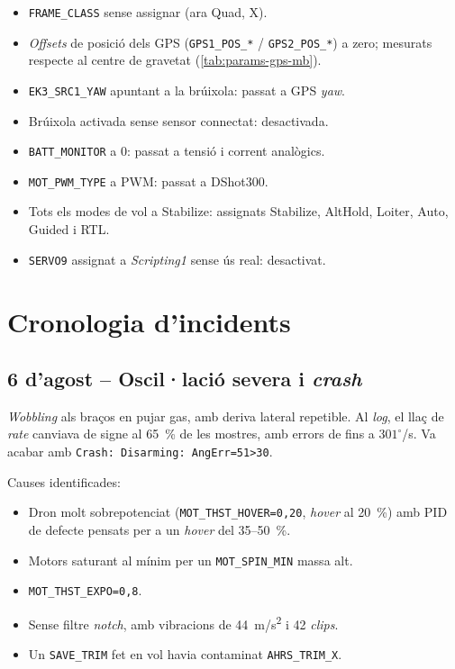 \begin{itemize}
    \item \texttt{FRAME\_CLASS} sense assignar (ara Quad, X).
    \item \emph{Offsets} de posició dels GPS (\texttt{GPS1\_POS\_*} / \texttt{GPS2\_POS\_*}) a zero; mesurats respecte al centre de gravetat (\cref{tab:params-gps-mb}).
    \item \texttt{EK3\_SRC1\_YAW} apuntant a la brúixola: passat a GPS \emph{yaw}.
    \item Brúixola activada sense sensor connectat: desactivada.
    \item \texttt{BATT\_MONITOR} a 0: passat a tensió i corrent analògics.
    \item \texttt{MOT\_PWM\_TYPE} a PWM: passat a DShot300.
    \item Tots els modes de vol a Stabilize: assignats Stabilize, AltHold, Loiter, Auto, Guided i RTL.
    \item \texttt{SERVO9} assignat a \emph{Scripting1} sense ús real: desactivat.
\end{itemize}

\section{Cronologia d'incidents}
\label{sec:cronologia-incidents}

\subsection{6 d'agost -- Oscil·lació severa i \emph{crash}}

\emph{Wobbling} als braços en pujar gas, amb deriva lateral repetible. Al \emph{log}, el llaç de \emph{rate} canviava de signe al 65~\% de les mostres, amb errors de fins a $301^{\circ}$/s. Va acabar amb \texttt{Crash: Disarming: AngErr=51>30}.

Causes identificades:
\begin{itemize}
    \item Dron molt sobrepotenciat (\texttt{MOT\_THST\_HOVER=0{,}20}, \emph{hover} al 20~\%) amb PID de defecte pensats per a un \emph{hover} del 35--50~\%.
    \item Motors saturant al mínim per un \texttt{MOT\_SPIN\_MIN} massa alt.
    \item \texttt{MOT\_THST\_EXPO=0{,}8}.
    \item Sense filtre \emph{notch}, amb vibracions de 44~m/s\textsuperscript{2} i 42 \emph{clips}.
    \item Un \texttt{SAVE\_TRIM} fet en vol havia contaminat \texttt{AHRS\_TRIM\_X}.
\end{itemize}

